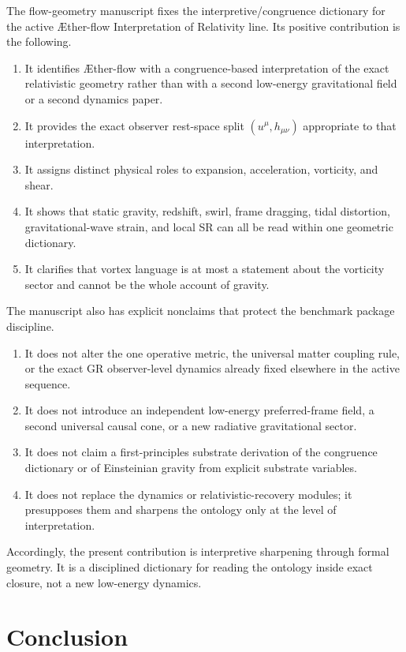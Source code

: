 \documentclass[11pt]{article}
\newcommand{\Aflow}{\AE{}ther-flow}
\newcommand{\TheoryName}{\Aflow{} Interpretation of Relativity}
\begin{document}
The flow-geometry manuscript fixes the interpretive/congruence dictionary for the active \TheoryName{} line. Its positive contribution is the following.
\begin{enumerate}
    \item It identifies \Aflow{} with a congruence-based interpretation of the exact relativistic geometry rather than with a second low-energy gravitational field or a second dynamics paper.
    \item It provides the exact observer rest-space split \((u^\mu,h_{\mu\nu})\) appropriate to that interpretation.
    \item It assigns distinct physical roles to expansion, acceleration, vorticity, and shear.
    \item It shows that static gravity, redshift, swirl, frame dragging, tidal distortion, gravitational-wave strain, and local SR can all be read within one geometric dictionary.
    \item It clarifies that vortex language is at most a statement about the vorticity sector and cannot be the whole account of gravity.
\end{enumerate}

The manuscript also has explicit nonclaims that protect the benchmark package discipline.
\begin{enumerate}
    \item It does not alter the one operative metric, the universal matter coupling rule, or the exact GR observer-level dynamics already fixed elsewhere in the active sequence.
    \item It does not introduce an independent low-energy preferred-frame field, a second universal causal cone, or a new radiative gravitational sector.
    \item It does not claim a first-principles substrate derivation of the congruence dictionary or of Einsteinian gravity from explicit substrate variables.
    \item It does not replace the dynamics or relativistic-recovery modules; it presupposes them and sharpens the ontology only at the level of interpretation.
\end{enumerate}

Accordingly, the present contribution is interpretive sharpening through formal geometry. It is a disciplined dictionary for reading the ontology inside exact closure, not a new low-energy dynamics.

\section{Conclusion}
\end{document}
